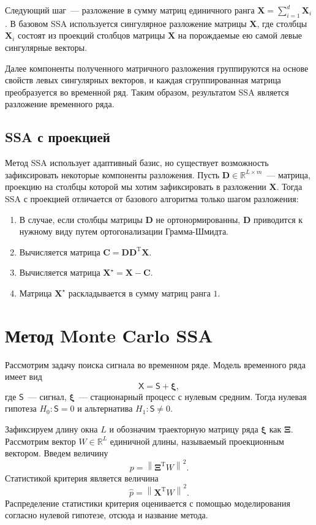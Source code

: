 \documentclass{math-mech-sci}
\begin{document}
Следующий шаг~--- разложение в сумму матриц единичного ранга $\mathbf{X}=\sum_{i=1}^d \mathbf{X}_i$. В базовом SSA используется сингулярное разложение матрицы $\mathbf{X}$, где столбцы $\mathbf{X}_i$ состоят из проекций столбцов матрицы $\mathbf{X}$ на порождаемые ею  самой левые сингулярные векторы.

Далее компоненты полученного матричного разложения группируются на основе свойств левых сингулярных векторов, и каждая сгруппированная матрица преобразуется во временной ряд. Таким образом, результатом SSA является разложение временного ряда.

\subsection*{SSA с проекцией}
Метод SSA использует адаптивный базис, но существует возможность зафиксировать некоторые компоненты разложения. Пусть $\mathbf{D}\in\mathbb{R}^{L\times m}$~--- матрица, проекцию на столбцы которой мы хотим зафиксировать в разложении $\mathbf{X}$. Тогда SSA с проекцией отличается от базового алгоритма только шагом разложения:
\begin{enumerate}
    \item В случае, если столбцы матрицы $\mathbf{D}$ не ортонормированны, $\mathbf{D}$ приводится к нужному виду путем ортогонализации Грамма-Шмидта.
    \item Вычисляется матрица $\mathbf{C}=\mathbf{D}\mathbf{D}^\mathrm{T}\mathbf{X}$.
    \item Вычисляется матрица $\mathbf{X}^\star=\mathbf{X}-\mathbf{C}$.
    \item Матрица $\mathbf{X}^\star$ раскладывается в сумму матриц ранга $1$.
\end{enumerate}

\section*{Метод Monte Carlo SSA}
Рассмотрим задачу поиска сигнала во временном ряде. Модель временного ряда имеет вид
\[
    \mathsf{X}=\mathsf{S} + \bm\xi,
\]
где $\mathsf{S}$~--- сигнал, $\bm\xi$~--- стационарный процесс с нулевым средним. Тогда нулевая гипотеза $H_0:\mathsf{S}=0$ и альтернатива $H_1:\mathsf{S}\ne0$.

Зафиксируем длину окна $L$ и обозначим траекторную матрицу ряда $\boldsymbol\xi$ как $\mathbf\Xi$. Рассмотрим вектор $W\in \mathbb R^L$ единичной длины, называемый проекционным вектором. Введем величину
\[
    p=\left\|\mathbf\Xi^{\mathrm{T}} W\right\|^2.
\]
Статистикой критерия является величина
\[
    \widehat p = \left\|{\mathbf{X}}^{\mathrm{T}} W\right\|^2.
\]
Распределение статистики критерия оценивается с помощью моделирования согласно нулевой гипотезе, отсюда и название метода.
\end{document}
